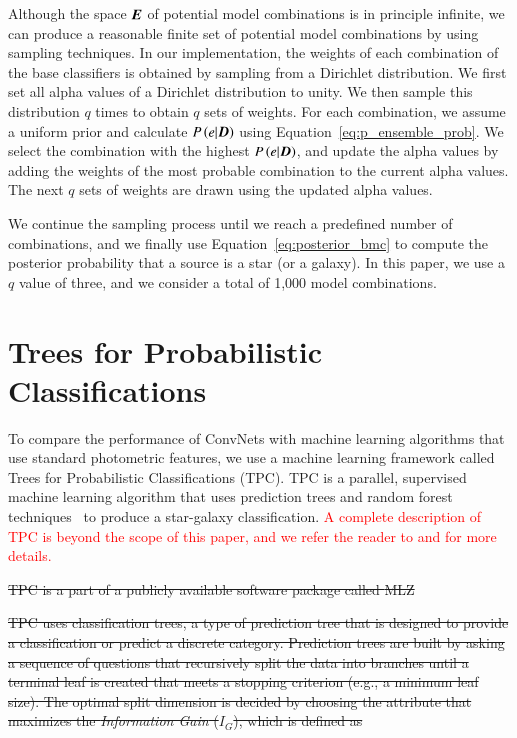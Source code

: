 \documentclass[fleqn,usenatbib]{mnras}
\newcommand{\eg}{{e.g., }}
\newcommand{\changed}[1]{\textcolor{red}{#1}}
\begin{document}
Although the space $\bmath{E}$ of potential model combinations
is in principle infinite,
we can produce a reasonable finite set
of potential model combinations by using sampling techniques.
In our implementation,
the weights of each combination of the base classifiers
is obtained by sampling from a Dirichlet distribution.
We first set all alpha values of a Dirichlet distribution to unity.
We then sample this distribution $q$ times
to obtain $q$ sets of weights.
For each combination,
we assume a uniform prior and
calculate $P\left(e|\bmath{D}\right)$ using
Equation~\ref{eq:p_ensemble_prob}.
We select the combination with the highest $P\left(e|\bmath{D}\right)$,
and update the alpha values by
adding the weights of the most probable combination
to the current alpha values.
The next $q$ sets of weights are drawn
using the updated alpha values.

We continue the sampling process until
we reach a predefined number of combinations,
and we finally use Equation~\ref{eq:posterior_bmc} to compute
the posterior probability that a source is a star (or a galaxy).
In this paper, we use a $q$ value of three,
and we consider a total of 1,000 model combinations.

\section{Trees for Probabilistic Classifications}
  \label{sec:tpc}

To compare the performance of ConvNets with
machine learning algorithms that use standard photometric features,
we use a machine learning framework called
Trees for Probabilistic Classifications (TPC).
TPC is a parallel, supervised machine learning algorithm
that uses prediction trees and random forest 
techniques~\citep{breiman1984classification, breiman2001random}
to produce a star-galaxy classification.
\changed{
A complete description of TPC is beyond the scope of this paper, and
we refer the reader to
\cite{carrascokind2013tpz} and \cite{kim2015hybrid} for more details.
}

\sout{ TPC is a part of a publicly available software package called \textsc{MLZ}%
}

\sout{ TPC uses classification trees, a type of prediction tree that is designed to provide a classification or predict a discrete category.  Prediction trees are built by asking a sequence of questions that recursively split the data into branches until a terminal leaf is created that meets a stopping criterion (\eg a minimum leaf size).  The optimal split dimension is decided by choosing the attribute that maximizes the \textit{Information Gain} ($I_G$), which is defined as }
\end{document}
